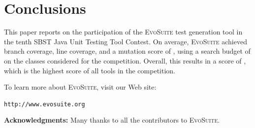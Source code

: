 \documentclass[sigconf]{acmart}
\newcommand{\EVOSUITE}{\textsc{EvoSuite}\xspace}
\begin{document}
\section{Conclusions}

This paper reports on the participation of the \EVOSUITE test generation tool
in the tenth SBST Java Unit Testing Tool Contest. On average, \EVOSUITE
achieved \avgConditionsCoverageRatioLong branch coverage,
\avgLinesCoverageRatioLong line coverage, and a mutation score of
\avgMutantsCoverageRatioLong, using a search budget of \budgetLong on the \cuts
classes considered for the competition. Overall, this results in a score of
\score, which is the highest score of all tools in the competition.


To learn more about \EVOSUITE, visit our Web site:
\begin{center}
\texttt{http://www.evosuite.org}
\end{center}



\textbf{Acknowledgments:} Many thanks to all the contributors to
\EVOSUITE.




\balance
\end{document}

